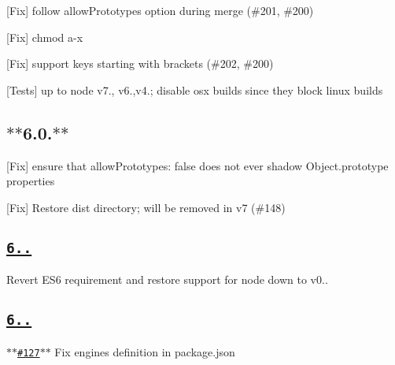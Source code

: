 \begin{DoxyItemize}
\item \mbox{[}Fix\mbox{]} follow {\ttfamily allow\+Prototypes} option during merge (\#201, \#200)
\item \mbox{[}Fix\mbox{]} chmod a-\/x
\item \mbox{[}Fix\mbox{]} support keys starting with brackets (\#202, \#200)
\item \mbox{[}Tests\mbox{]} up to {\ttfamily node} {\ttfamily v7.}, {\ttfamily v6.},{\ttfamily v4.}; disable osx builds since they block linux builds
\end{DoxyItemize}

\subsection*{$\ast$$\ast$6.0.$\ast$$\ast$}


\begin{DoxyItemize}
\item \mbox{[}Fix\mbox{]} ensure that {\ttfamily allow\+Prototypes\+: false} does not ever shadow Object.\+prototype properties
\item \mbox{[}Fix\mbox{]} Restore {\ttfamily dist} directory; will be removed in v7 (\#148)
\end{DoxyItemize}

\subsection*{\href{https://github.com/ljharb/qs/issues?milestone=33&state=closed}{\tt {\bfseries 6..}}}


\begin{DoxyItemize}
\item Revert E\+S6 requirement and restore support for node down to v0..
\end{DoxyItemize}

\subsection*{\href{https://github.com/ljharb/qs/issues?milestone=32&state=closed}{\tt {\bfseries 6..}}}


\begin{DoxyItemize}
\item \href{https://github.com/ljharb/qs/pull/127}{\tt $\ast$$\ast$\#127$\ast$$\ast$} Fix engines definition in package.\+json
\end{DoxyItemize}


